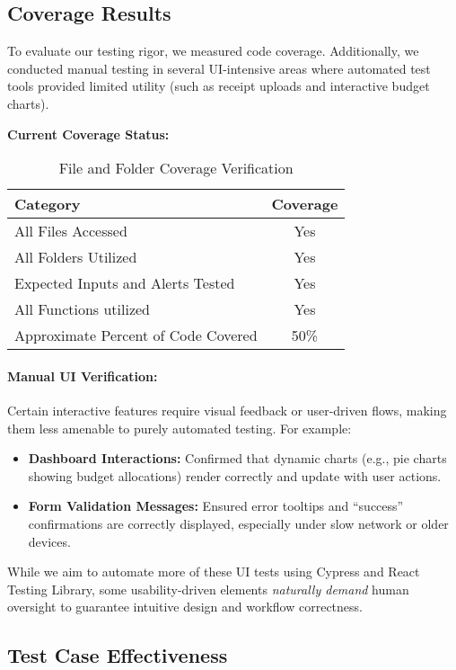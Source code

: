 \documentclass[12pt, titlepage]{article}
\begin{document}
\subsection{Coverage Results}

To evaluate our testing rigor, we measured code coverage. Additionally, we conducted  
manual testing in several UI-intensive areas where automated test tools provided  
limited utility (such as receipt uploads and interactive budget charts).

\noindent
\textbf{Current Coverage Status:}
\begin{table}[h]
  \centering
  \begin{tabular}{|l|c|}
      \hline
      \textbf{Category} & \textbf{Coverage} \\
      \hline
      All Files Accessed & Yes \\
      All Folders Utilized & Yes \\
      Expected Inputs and Alerts Tested & Yes \\
      All Functions utilized & Yes \\
      Approximate Percent of Code Covered & 50\% \\
      \hline
  \end{tabular}
  \caption{File and Folder Coverage Verification}
  \label{tab:file_coverage}
  \end{table}

  
\paragraph{Manual UI Verification:}
Certain interactive features require visual feedback or user-driven flows, making them less  
amenable to purely automated testing. For example:
\begin{itemize}
  \item \textbf{Dashboard Interactions:} Confirmed that dynamic charts (e.g., pie charts  
    showing budget allocations) render correctly and update with user actions.
  \item \textbf{Form Validation Messages:} Ensured error tooltips and “success”  
    confirmations are correctly displayed, especially under slow network or older devices.
\end{itemize}
While we aim to automate more of these UI tests using Cypress and React Testing Library,  
some usability-driven elements \emph{naturally demand} human oversight to guarantee 
intuitive design and workflow correctness.

\subsection{Test Case Effectiveness}
\end{document}
